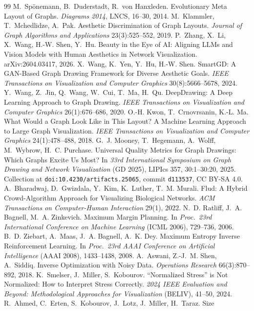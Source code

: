 \documentclass[11pt]{article}
\begin{document}
{\begin{thebibliography}{99}
 M.~Sp\"onemann, B.~Duderstadt, R.~von Hanxleden. Evolutionary Meta
 Layout of Graphs. \emph{Diagrams 2014}, LNCS, 16--30, 2014.
 M.~Klammler, T.~Mchedlidze, A.~Pak. Aesthetic Discrimination of Graph
 Layouts. \emph{Journal of Graph Algorithms and Applications} 23(3):525--552, 2019.
 P.~Zhang, X.~Li, X.~Wang, H.-W. Shen, Y.~Hu. Beauty in the Eye of AI:
 Aligning LLMs and Vision Models with Human Aesthetics in Network Visualization.
 arXiv:2604.03417, 2026.
 X.~Wang, K.~Yen, Y.~Hu, H.-W. Shen. SmartGD: A GAN-Based Graph Drawing
 Framework for Diverse Aesthetic Goals. \emph{IEEE Transactions on Visualization and
 Computer Graphics} 30(8):5666--5678, 2024.
 Y.~Wang, Z.~Jin, Q.~Wang, W.~Cui, T.~Ma, H.~Qu. DeepDrawing: A Deep
 Learning Approach to Graph Drawing. \emph{IEEE Transactions on Visualization and Computer
 Graphics} 26(1):676--686, 2020.
 O.-H. Kwon, T.~Crnovrsanin, K.-L. Ma. What Would a Graph Look Like in
 This Layout? A Machine Learning Approach to Large Graph Visualization. \emph{IEEE
 Transactions on Visualization and Computer Graphics} 24(1):478--488, 2018.
 G.~J. Mooney, T.~Hegemann, A.~Wolff, M.~Wybrow, H.~C. Purchase.
 Universal Quality Metrics for Graph Drawings: Which Graphs Excite Us Most? In \emph{33rd
 International Symposium on Graph Drawing and Network Visualization} (GD 2025), LIPIcs 357,
 30:1--30:20, 2025. Collection at \texttt{doi:10.4230/artifacts.25065}, commit
 \texttt{d113537}, CC BY-SA 4.0.
 A.~Bharadwaj, D.~Gwizdala, Y.~Kim, K.~Luther, T.~M. Murali. Flud: A Hybrid
 Crowd-Algorithm Approach for Visualizing Biological Networks. \emph{ACM Transactions on
 Computer-Human Interaction} 29(1), 2022.
 N.~D. Ratliff, J.~A. Bagnell, M.~A. Zinkevich. Maximum Margin
 Planning. In \emph{Proc.\ 23rd International Conference on Machine Learning} (ICML 2006),
 729--736, 2006.
 B.~D. Ziebart, A.~Maas, J.~A. Bagnell, A.~K. Dey. Maximum Entropy
 Inverse Reinforcement Learning. In \emph{Proc.\ 23rd AAAI Conference on Artificial
 Intelligence} (AAAI 2008), 1433--1438, 2008.
 A.~Aswani, Z.-J.~M. Shen, A.~Siddiq. Inverse Optimization with Noisy
 Data. \emph{Operations Research} 66(3):870--892, 2018.
 K.~Smelser, J.~Miller, S.~Kobourov. ``Normalized Stress'' is Not
 Normalized: How to Interpret Stress Correctly. \emph{2024 IEEE Evaluation and Beyond:
 Methodological Approaches for Visualization} (BELIV), 41--50, 2024.
 R.~Ahmed, C.~Erten, S.~Kobourov, J.~Lotz, J.~Miller, H.~Taraz. Size

\end{thebibliography}}
\end{document}
